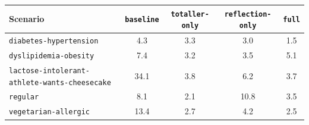 \begin{tabular}{lS[table-format=2.1]S[table-format=2.1]S[table-format=2.1]S[table-format=2.1]}
\toprule
Scenario & {\texttt{baseline}} & {\texttt{totaller-only}} & {\texttt{reflection-only}} & {\texttt{full}} \\
\midrule
\texttt{diabetes-\allowbreak hypertension} & 4.3 & 3.3 & 3.0 & 1.5 \\
\texttt{dyslipidemia-\allowbreak obesity} & 7.4 & 3.2 & 3.5 & 5.1 \\
\texttt{lactose-\allowbreak intolerant-\allowbreak athlete-\allowbreak wants-\allowbreak cheesecake} & 34.1 & 3.8 & 6.2 & 3.7 \\
\texttt{regular} & 8.1 & 2.1 & 10.8 & 3.5 \\
\texttt{vegetarian-\allowbreak allergic} & 13.4 & 2.7 & 4.2 & 2.5 \\
\bottomrule
\end{tabular}
